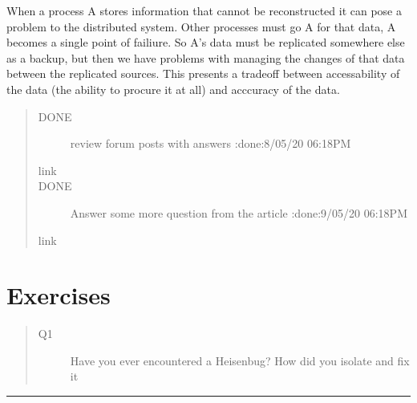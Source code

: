 \documentclass[letterpaper,10pt,english]{sphinxmanual}
\begin{document}
When a process  A stores information that cannot be reconstructed it can pose a problem to
the distributed system. Other processes must go A for that data, A becomes a single point
of failiure. So A’s data must be replicated somewhere else as a backup, but then we have
problems with managing the changes of that data between the replicated sources. This
presents a trade\sphinxhyphen{}off between accessability of the data (the ability to procure it at all)
and acccuracy of the data.
\begin{quote}\begin{description}
\item[{DONE}] \leavevmode
review forum posts with answers :done:8/05/20 06:18PM

\item[{link}] \leavevmode
{}

\item[{DONE}] \leavevmode
Answer some more question from the article :done:9/05/20 06:18PM

\item[{link}] \leavevmode
{}

\end{description}\end{quote}


\section{Exercises}
\label{\detokenize{google_article:exercises}}\begin{quote}\begin{description}
\item[{Q1}] \leavevmode
Have you ever encountered a Heisenbug? How did you isolate and fix it

\end{description}\end{quote}


\bigskip\hrule\bigskip
\end{document}
